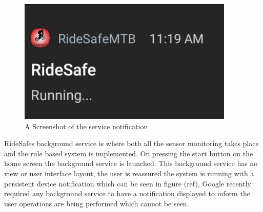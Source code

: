 \begin{figure}
\begin{center}
\includegraphics[scale = 0.2] {implementation/service.jpg}
\end{center}
\caption{A Screenshot of the service notification}
\label{crash}
\end{figure}

RideSafes background service is where both all the sensor monitoring takes place and the rule based system is implemented. On pressing the start button on the home screen the background service is launched. This background service has no view or user interface layout, the user is reassured the system is running  with a persistent device notification which can be seen in figure (ref), Google recently required any background service to have a notification displayed to inform the user operations are being performed which cannot be seen.



